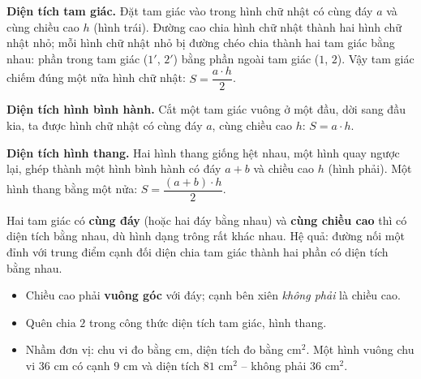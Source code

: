 \begin{proofbox}
\textbf{Diện tích tam giác.} Đặt tam giác vào trong hình chữ nhật có cùng đáy $a$ và cùng chiều cao $h$ (hình trái). Đường cao chia hình chữ nhật thành hai hình chữ nhật nhỏ; mỗi hình chữ nhật nhỏ bị đường chéo chia thành hai tam giác bằng nhau: phần trong tam giác ($1'$, $2'$) bằng phần ngoài tam giác ($1$, $2$). Vậy tam giác chiếm đúng một nửa hình chữ nhật: $S=\dfrac{a\cdot h}{2}$.

\textbf{Diện tích hình bình hành.} Cắt một tam giác vuông ở một đầu, dời sang đầu kia, ta được hình chữ nhật có cùng đáy $a$, cùng chiều cao $h$: $S=a\cdot h$.

\textbf{Diện tích hình thang.} Hai hình thang giống hệt nhau, một hình quay ngược lại, ghép thành một hình bình hành có đáy $a+b$ và chiều cao $h$ (hình phải). Một hình thang bằng một nửa: $S=\dfrac{(a+b)\cdot h}{2}$.
\end{proofbox}

\begin{tipbox}
Hai tam giác có \textbf{cùng đáy} (hoặc hai đáy bằng nhau) và \textbf{cùng chiều cao} thì có diện tích bằng nhau, dù hình dạng trông rất khác nhau. Hệ quả: đường nối một đỉnh với trung điểm cạnh đối diện chia tam giác thành hai phần có diện tích bằng nhau.
\end{tipbox}

\begin{warnbox}
\begin{itemize}[leftmargin=1.3em,itemsep=1pt,topsep=0pt]
  \item Chiều cao phải \textbf{vuông góc} với đáy; cạnh bên xiên \emph{không phải} là chiều cao.
  \item Quên chia $2$ trong công thức diện tích tam giác, hình thang.
  \item Nhầm đơn vị: chu vi đo bằng cm, diện tích đo bằng $\text{cm}^2$. Một hình vuông chu vi $36$ cm có cạnh $9$ cm và diện tích $81\text{ cm}^2$ -- không phải $36\text{ cm}^2$.
\end{itemize}
\end{warnbox}

